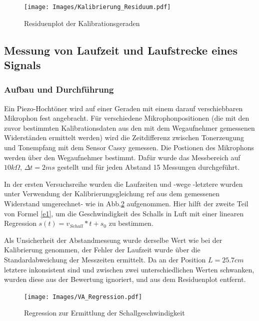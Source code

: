 \documentclass[]{article}
\begin{document}
	\begin{figure}
	\begin{center}
		\texttt{[image: Images/Kalibrierung\_Residuum.pdf]}
		\caption{Residuenplot der Kalibrationsgeraden}
		\label{Kalib_Res}
	\end{center}
	\end{figure}

	\subsection{Messung von Laufzeit und Laufstrecke eines Signals}
	\subsubsection{Aufbau und Durchführung}
	Ein Piezo-Hochtöner wird auf einer Geraden mit einem darauf verschiebbaren Mikrophon fest angebracht. Für verschiedene Mikrophonpositionen (die mit den zuvor bestimmten Kalibrationsdaten aus den mit dem Wegaufnehmer gemessenen Widerständen ermittelt werden) wird die Zeitdifferenz zwischen Tonerzeugung und Tonempfang mit dem Sensor Cassy gemessen.  Die Postionen des Mikrophons werden über den Wegaufnehmer bestimmt. Dafür wurde das Messbereich auf $10 k\Omega$, $\Delta t = 2 ms$ gestellt und für jeden Abstand 15 Messungen durchgeführt.

	In der ersten Versuchsreihe wurden die Laufzeiten und -wege -letztere wurden unter Verwendung der Kalibrierungsgleichung {\color{red} ref} aus dem gemessenen Widerstand umgerechnet- wie in Abb.\ref{Va_Reg} aufgenommen. Hier hilft der zweite Teil von Formel \ref{e1}, um die Geschwindigkeit des Schalls in Luft mit einer linearen Regression $s(t)=v_{Schall}*t+s_0$ zu bestimmen. 
	
	
 Als Unsicherheit der Abstandmessung wurde derselbe Wert wie bei der Kalibrierung genommen, der Fehler der Laufzeit wurde über die Standardabweichung der Messzeiten ermittelt. Da an der Position 
	$L = 25.7 cm$ letztere inkonsistent sind und zwischen zwei unterschiedlichen Werten schwanken, wurden diese aus der Bewertung ignoriert, und aus dem Residuenplot entfernt.\\
	
	
	\begin{figure}
	\begin{center}
		\texttt{[image: Images/VA\_Regression.pdf]}
		\caption{Regression zur Ermittlung der Schallgeschwindigkeit}
		\label{Va_Reg}
	\end{center}
	\end{figure}
	
\end{document}
